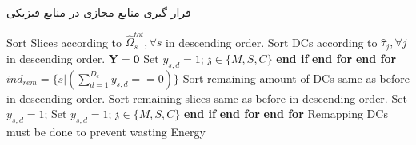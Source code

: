 \begin{algorithm}
	\caption{قرار گیری منابع مجازی در منابع فیزیکی}\label{alg3}
	\begin{latin}
	\begin{algorithmic}[1]
		\State Sort Slices according to $\hat{\Omega}_{s}^{tot} , \forall s$ in descending order.\label{31}
		\State Sort DCs according to $\hat{\tau}_j , \forall j$ in descending order. \label{32}
		\State $\boldsymbol{Y} = \boldsymbol{0}$
		\label{33}
		\State Set $y_{s,d} = 1$;
		 $\mathfrak{z}\in \{M,S,C\}$
		\EndIf
		\State \textbf{end if}
		\EndFor
		\State \textbf{end for}
		\EndFor
		\State \textbf{end for} \label{34}
		\State  $ind_{rem} = \{s|({\sum_{d=1}^{D_c}y_{s,d}==0})\}$ \label{35}
		\State Sort remaining amount of DCs same as before in descending order.
		\State Sort remaining slices same as before in descending order.
		\State Set $y_{s,d} = 1$;
		\State Set $y_{s,d} = 1$;
		 $\mathfrak{z}\in \{M,S,C\}$
		\EndIf
		\State \textbf{end if}
		\EndFor
		\State \textbf{end for}
		\EndFor
		\State \textbf{end for} \label{36}
		\State Remapping DCs must be done to prevent wasting Energy \label{37}
	\end{algorithmic}
\end{latin}
\end{algorithm}
